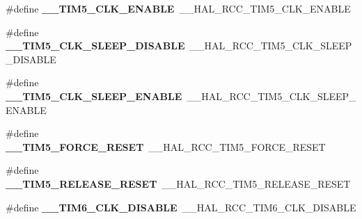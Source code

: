 \begin{DoxyCompactItemize}
\item 
\mbox{\label{group___h_a_l___r_c_c___aliased_ga88ce7393e694b7304832f859e79bbb45}} 
\#define {\bfseries \+\_\+\+\_\+\+T\+I\+M5\+\_\+\+C\+L\+K\+\_\+\+E\+N\+A\+B\+LE}~\+\_\+\+\_\+\+H\+A\+L\+\_\+\+R\+C\+C\+\_\+\+T\+I\+M5\+\_\+\+C\+L\+K\+\_\+\+E\+N\+A\+B\+LE
\item 
\mbox{\label{group___h_a_l___r_c_c___aliased_ga6ef0270755ff81bb2bbdfabbe4565041}} 
\#define {\bfseries \+\_\+\+\_\+\+T\+I\+M5\+\_\+\+C\+L\+K\+\_\+\+S\+L\+E\+E\+P\+\_\+\+D\+I\+S\+A\+B\+LE}~\+\_\+\+\_\+\+H\+A\+L\+\_\+\+R\+C\+C\+\_\+\+T\+I\+M5\+\_\+\+C\+L\+K\+\_\+\+S\+L\+E\+E\+P\+\_\+\+D\+I\+S\+A\+B\+LE
\item 
\mbox{\label{group___h_a_l___r_c_c___aliased_gaa24fdb3b0088008c20c6e5ecccd3f6b6}} 
\#define {\bfseries \+\_\+\+\_\+\+T\+I\+M5\+\_\+\+C\+L\+K\+\_\+\+S\+L\+E\+E\+P\+\_\+\+E\+N\+A\+B\+LE}~\+\_\+\+\_\+\+H\+A\+L\+\_\+\+R\+C\+C\+\_\+\+T\+I\+M5\+\_\+\+C\+L\+K\+\_\+\+S\+L\+E\+E\+P\+\_\+\+E\+N\+A\+B\+LE
\item 
\mbox{\label{group___h_a_l___r_c_c___aliased_gaa07976dd4fea46ea3607d60c91135d57}} 
\#define {\bfseries \+\_\+\+\_\+\+T\+I\+M5\+\_\+\+F\+O\+R\+C\+E\+\_\+\+R\+E\+S\+ET}~\+\_\+\+\_\+\+H\+A\+L\+\_\+\+R\+C\+C\+\_\+\+T\+I\+M5\+\_\+\+F\+O\+R\+C\+E\+\_\+\+R\+E\+S\+ET
\item 
\mbox{\label{group___h_a_l___r_c_c___aliased_ga9147d36f3775a32d40f0abcf2fd38fef}} 
\#define {\bfseries \+\_\+\+\_\+\+T\+I\+M5\+\_\+\+R\+E\+L\+E\+A\+S\+E\+\_\+\+R\+E\+S\+ET}~\+\_\+\+\_\+\+H\+A\+L\+\_\+\+R\+C\+C\+\_\+\+T\+I\+M5\+\_\+\+R\+E\+L\+E\+A\+S\+E\+\_\+\+R\+E\+S\+ET
\item 
\mbox{\label{group___h_a_l___r_c_c___aliased_ga16facf74d71ea54b2a9da63cffe0c99a}} 
\#define {\bfseries \+\_\+\+\_\+\+T\+I\+M6\+\_\+\+C\+L\+K\+\_\+\+D\+I\+S\+A\+B\+LE}~\+\_\+\+\_\+\+H\+A\+L\+\_\+\+R\+C\+C\+\_\+\+T\+I\+M6\+\_\+\+C\+L\+K\+\_\+\+D\+I\+S\+A\+B\+LE
\item 
\mbox{\label{group___h_a_l___r_c_c___aliased_gaa4a746941c7432e4c3cbf7530cbd0b36}} 

\end{DoxyCompactItemize}
